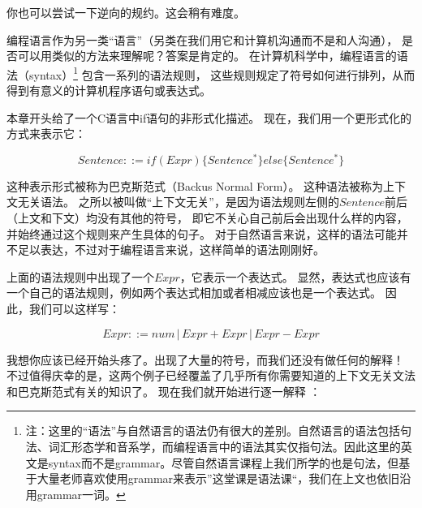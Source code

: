 \documentclass[../main.tex]{subfiles}
\begin{document}
    \indent 你也可以尝试一下逆向的规约。这会稍有难度。
    \newline
  
  \indent 编程语言作为另一类“语言”（另类在我们用它和计算机沟通而不是和人沟通），
  是否可以用类似的方法来理解呢？答案是肯定的。
  在计算机科学中，编程语言的语法（syntax）\footnote[1]{注：这里的“语法”与自然语言的语法仍有很大的差别。自然语言的语法包括句法、词汇形态学和音系学\cite{grammar}，而编程语言中的语法其实仅指句法。因此这里的英文是syntax而不是grammar。尽管自然语言课程上我们所学的也是句法，但基于大量老师喜欢使用grammar来表示”这堂课是语法课“，我们在上文也依旧沿用grammar一词。}
  包含一系列的语法规则，
  这些规则规定了符号如何进行排列，从而得到有意义的计算机程序语句或表达式。\cite{syntaxwiki}

  \indent 本章开头给了一个C语言中if语句的非形式化描述。
  现在，我们用一个更形式化的方式来表示它：

  $$
  Sentence ::= if(Expr)\{ Sentence^*\} else\{Sentence^*\}
  $$

  \indent 这种表示形式被称为巴克斯范式（Backus Normal Form）。
  这种语法被称为上下文无关语法。\cite{bnfwiki}
  之所以被叫做“上下文无关”，是因为语法规则左侧的$Sentence$前后（上文和下文）均没有其他的符号，
  即它不关心自己前后会出现什么样的内容，并始终通过这个规则来产生具体的句子。\cite{cfgwiki}
  对于自然语言来说，这样的语法可能并不足以表达，不过对于编程语言来说，这样简单的语法刚刚好。

  \indent 上面的语法规则中出现了一个$Expr$，它表示一个表达式。
  显然，表达式也应该有一个自己的语法规则，例如两个表达式相加或者相减应该也是一个表达式。
  因此，我们可以这样写：

  $$Expr ::= num\,|\,Expr + Expr\,|\,Expr - Expr$$

  \indent 我想你应该已经开始头疼了。出现了大量的符号，而我们还没有做任何的解释！
  不过值得庆幸的是，这两个例子已经覆盖了几乎所有你需要知道的上下文无关文法和巴克斯范式有关的知识了。
  现在我们就开始进行逐一解释\cite{bnfwiki} \cite{cfgwiki}：
\end{document}
